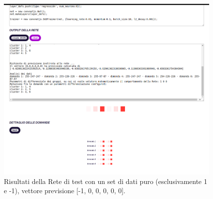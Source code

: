 \begin{figure}[H]
\centering
	\includegraphics[width=1\linewidth]{./image/RetediProva_generatorinputpuro.png}
	\caption{Risultati della Rete di test con un set di dati puro (esclusivamente 1 e -1), vettore previsione [-1, 0, 0, 0, 0, 0].}
	\label{Risultati della Rete di test con un set di dati puro (esclusivamente 1 e -1), vettore previsione [-1, 0, 0, 0, 0, 0].}
\end{figure}
\noindent

